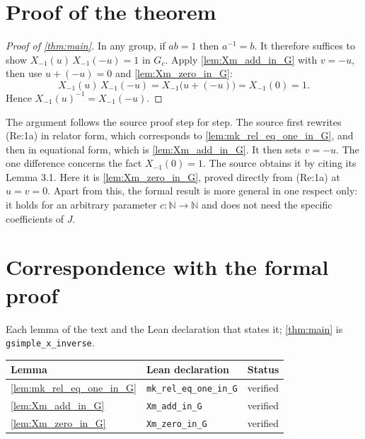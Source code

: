 \documentclass[11pt]{article}
\theoremstyle{definition}
\theoremstyle{remark}
\newcommand{\NN}{\mathbb{N}}
\begin{document}
\section{Proof of the theorem}

\begin{proof}[Proof of \cref{thm:main}]
In any group, if $ab=1$ then $a^{-1}=b$. It therefore suffices to show $X_{-1}(u)\,X_{-1}(-u)=1$ in $G_c$. Apply \cref{lem:Xm_add_in_G} with $v=-u$, then use $u+(-u)=0$ and \cref{lem:Xm_zero_in_G}:
\[
X_{-1}(u)\,X_{-1}(-u)=X_{-1}\big(u+(-u)\big)=X_{-1}(0)=1.
\]
Hence $X_{-1}(u)^{-1}=X_{-1}(-u)$.
\end{proof}

The argument follows the source proof step for step. The source first rewrites (Re:1a) in relator form, which corresponds to \cref{lem:mk_rel_eq_one_in_G}, and then in equational form, which is \cref{lem:Xm_add_in_G}. It then sets $v=-u$. The one difference concerns the fact $X_{-1}(0)=1$. The source obtains it by citing its Lemma 3.1. Here it is \cref{lem:Xm_zero_in_G}, proved directly from (Re:1a) at $u=v=0$. Apart from this, the formal result is more general in one respect only: it holds for an arbitrary parameter $c\colon\NN\to\NN$ and does not need the specific coefficients of $J$.

\appendix
\section{Correspondence with the formal proof}
Each lemma of the text and the Lean declaration that states it; \cref{thm:main} is \texttt{gsimple\_x\_inverse}.

\begin{longtable}{@{}lll@{}}
\toprule
Lemma & Lean declaration & Status \\
\midrule
\endhead
\cref{lem:mk_rel_eq_one_in_G} & \texttt{mk\_rel\_eq\_one\_in\_G} & verified \\
\cref{lem:Xm_add_in_G} & \texttt{Xm\_add\_in\_G} & verified \\
\cref{lem:Xm_zero_in_G} & \texttt{Xm\_zero\_in\_G} & verified \\
\bottomrule
\end{longtable}
\end{document}
